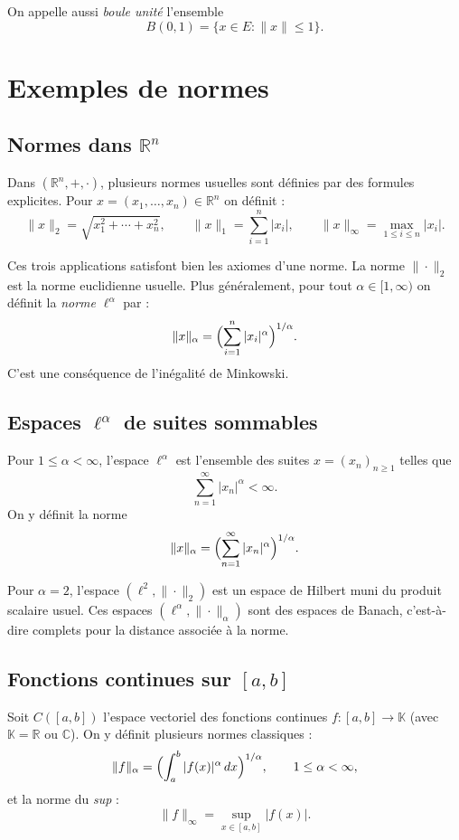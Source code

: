 On appelle aussi \emph{boule unit\'e} l’ensemble
\[
B(0,1) = \{x\in E : \|x\|\le 1\}.
\]

\section{Exemples de normes}

\subsection{Normes dans \(\mathbb{R}^n\)}

Dans \(\left(\mathbb{R}^n,+,\cdot\right)\), plusieurs normes usuelles sont d\'efinies par des formules explicites.
Pour \(x=(x_1,\dots,x_n)\in\mathbb{R}^n\) on d\'efinit :
\[
\|x\|_2 = \sqrt{x_1^2+\cdots+x_n^2},
\qquad
\|x\|_1 = \sum_{i=1}^n |x_i|,
\qquad
\|x\|_\infty = \max_{1\le i\le n}|x_i|.
\]

Ces trois applications satisfont bien les axiomes d’une norme.
La norme \(\|\cdot\|_2\) est la norme euclidienne usuelle.
Plus g\'en\'eralement, pour tout \(\alpha\in[1,\infty)\) on d\'efinit la \emph{norme \(\ell^\alpha\)} par :
\[
\|x\|_\alpha = \Bigl(\sum_{i=1}^n |x_i|^\alpha\Bigr)^{1/\alpha}.
\]
C’est une cons\'equence de l’in\'egalit\'e de Minkowski.

\subsection{Espaces \(\ell^\alpha\) de suites sommables}

Pour \(1\le \alpha<\infty\), l’espace \(\ell^\alpha\) est l’ensemble des suites \(x=(x_n)_{n\ge1}\) telles que
\[
\sum_{n=1}^\infty |x_n|^\alpha < \infty.
\]
On y d\'efinit la norme
\[
\|x\|_\alpha = \Bigl(\sum_{n=1}^\infty |x_n|^\alpha\Bigr)^{1/\alpha}.
\]

Pour \(\alpha=2\), l’espace \((\ell^2,\|\cdot\|_2)\) est un espace de Hilbert muni du produit scalaire usuel.
Ces espaces \((\ell^\alpha,\|\cdot\|_\alpha)\) sont des espaces de Banach, c’est-\`a-dire complets pour la distance associ\'ee \`a la norme.

\subsection{Fonctions continues sur \([a,b]\)}

Soit \(C([a,b])\) l’espace vectoriel des fonctions continues \(f:[a,b]\to\mathbb{K}\)
(avec \(\mathbb{K}=\mathbb{R}\) ou \(\mathbb{C}\)).
On y d\'efinit plusieurs normes classiques :
\[
\|f\|_\alpha = \Bigl(\int_a^b |f(x)|^\alpha\,dx\Bigr)^{1/\alpha}, \qquad 1\le \alpha<\infty,
\]
et la norme du \emph{sup} :
\[
\|f\|_\infty = \sup_{x\in[a,b]} |f(x)|.
\]

